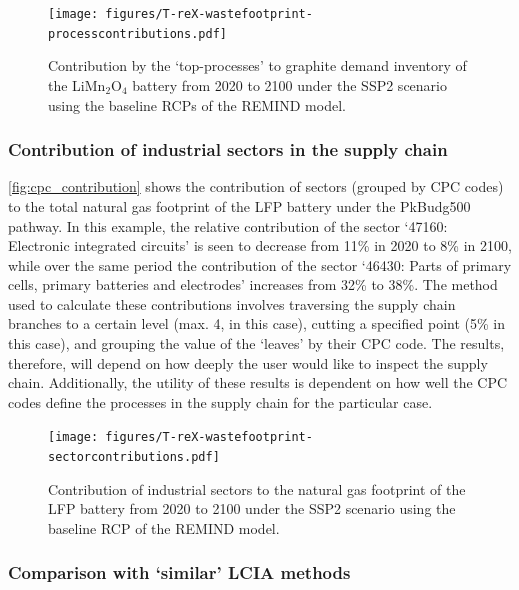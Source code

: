 \documentclass[a4paper,fleqn,longmktitle]{cas-dc}
\begin{document}
\begin{figure}[H]
    \centering
    \texttt{[image: figures/T-reX-wastefootprint-processcontributions.pdf]}
    \caption{Contribution by the `top-processes' to graphite demand inventory of the LiMn\(_2\)O\(_4\) battery from 2020 to 2100 under the SSP2 scenario using the baseline RCPs of the REMIND model.}\label{fig:top_contribution}
\end{figure}


\subsubsection{Contribution of industrial sectors in the supply chain}\label{sec:results-case_study-topsectors}

\autoref{fig:cpc_contribution} shows the contribution of sectors (grouped by CPC codes) to the total natural gas footprint of the LFP battery under the PkBudg500 pathway. In this example, the relative contribution of the sector `47160: Electronic integrated circuits' is seen to decrease from 11\% in 2020 to 8\% in 2100, while over the same period the contribution of the sector `46430: Parts of primary cells, primary batteries and electrodes' increases from 32\% to 38\%. The method used to calculate these contributions involves traversing the supply chain branches to a certain level (max. 4, in this case), cutting a specified point (5\% in this case), and grouping the value of the `leaves' by their CPC code. The results, therefore, will depend on how deeply the user would like to inspect the supply chain. Additionally, the utility of these results is dependent on how well the CPC codes define the processes in the supply chain for the particular case.

\begin{figure}[H]
    \centering
    \texttt{[image: figures/T-reX-wastefootprint-sectorcontributions.pdf]}
    \caption{Contribution of industrial sectors to the natural gas footprint of the LFP battery from 2020 to 2100 under the SSP2 scenario using the baseline RCP of the REMIND model.}\label{fig:cpc_contribution}
\end{figure}


\subsubsection{Comparison with `similar' LCIA methods}\label{sec:results-case_study-methodcomparison}
\end{document}

